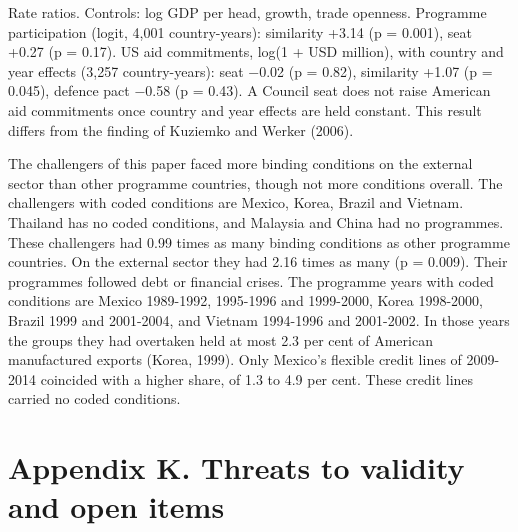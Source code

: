 Rate ratios. Controls: log GDP per head, growth, trade openness.
Programme participation (logit, 4,001 country-years): similarity +3.14
(p = 0.001), seat +0.27 (p = 0.17). US aid commitments, log(1 + USD
million), with country and year effects (3,257 country-years): seat
−0.02 (p = 0.82), similarity +1.07 (p = 0.045), defence pact −0.58 (p =
0.43). A Council seat does not raise American aid commitments once
country and year effects are held constant. This result differs from the
finding of Kuziemko and Werker (2006).

The challengers of this paper faced more binding conditions on the
external sector than other programme countries, though not more
conditions overall. The challengers with coded conditions are Mexico,
Korea, Brazil and Vietnam. Thailand has no coded conditions, and
Malaysia and China had no programmes. These challengers had 0.99 times
as many binding conditions as other programme countries. On the external
sector they had 2.16 times as many (p = 0.009). Their programmes
followed debt or financial crises. The programme years with coded
conditions are Mexico 1989-1992, 1995-1996 and 1999-2000, Korea
1998-2000, Brazil 1999 and 2001-2004, and Vietnam 1994-1996 and
2001-2002. In those years the groups they had overtaken held at most 2.3
per cent of American manufactured exports (Korea, 1999). Only Mexico's
flexible credit lines of 2009-2014 coincided with a higher share, of 1.3
to 4.9 per cent. These credit lines carried no coded conditions.

\hypertarget{k.-threats-to-validity-and-open-items}{%
\section*{Appendix K. Threats to validity and open
items}\label{k.-threats-to-validity-and-open-items}}

